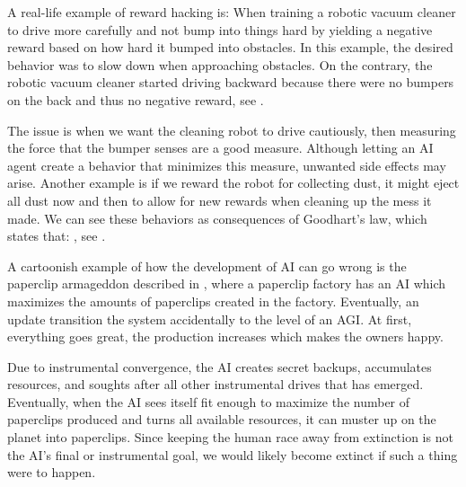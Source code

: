 \documentclass[12pt,A4]{report}
\theoremstyle{definition}
\begin{document}
A real-life example of reward hacking is: When training a robotic vacuum cleaner to drive more carefully and not bump into things hard by yielding a negative reward based on how hard it bumped into obstacles. In this example, the desired behavior was to slow down when approaching obstacles. On the contrary, the robotic vacuum cleaner started driving backward because there were no bumpers on the back and thus no negative reward, see \citet{Smingleigh}. 

The issue is when we want the cleaning robot to drive cautiously, then measuring the force that the bumper senses are a good measure. Although letting an AI agent create a behavior that minimizes this measure, unwanted side effects may arise. Another example is if we reward the robot for collecting dust, it might eject all dust now and then to allow for new rewards when cleaning up the mess it made. We can see these behaviors as consequences of Goodhart's law, which states that: , see \citet{wikiGoodhart}. %



A cartoonish example of how the development of AI can go wrong is the paperclip armageddon described in \citet{Bostrom14}, where a paperclip factory has an AI which maximizes the amounts of paperclips created in the factory. Eventually, an update transition the system accidentally to the level of an AGI. At first, everything goes great, the production increases which makes the owners happy. 

Due to instrumental convergence, the AI creates secret backups, accumulates resources, and soughts after all other instrumental drives that has emerged. Eventually, when the AI sees itself fit enough to maximize the number of paperclips produced and turns all available resources, it can muster up on the planet into paperclips. Since keeping the human race away from extinction is not the AI's final or instrumental goal, we would likely become extinct if such a thing were to happen.
\end{document}
